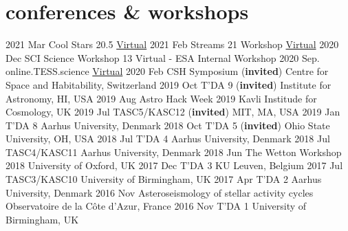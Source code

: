 \documentclass[letterpaper]{k-cv} %
\begin{document}
\clearpage
{}

\section{\color{c1}conferences \& workshops}

\begin{entrylist}
\centrythree
{2021 Mar}
{Cool Stars 20.5}
{\href{http://coolstars20.cfa.harvard.edu/cs20half/program.html}{Virtual}}
\centrythree
{2021 Feb}
{Streams 21 Workshop}
{\href{https://stellarstreams.org/streams21/}{Virtual}}
\centrythree
{2020 Dec}
{SCI Science Workshop 13}
{Virtual - ESA Internal Workshop}
\centrythree
{2020 Sep.}
{online.TESS.science}
{\href{https://online.tess.science/}{Virtual}}
\centrythree
{2020 Feb}
{CSH Symposium (\textbf{\textcolor{c1}{invited}})}
{Centre for Space and Habitability, Switzerland}
\centrythree
{2019 Oct}
{T'DA 9 (\textbf{\textcolor{c1}{invited}})}
{Institute for Astronomy, HI, USA}
\centrythree
{2019 Aug}
{Astro Hack Week 2019}
{Kavli Institude for Cosmology, UK}
\centrythree
{2019 Jul}
{TASC5/KASC12  (\textbf{\textcolor{c1}{invited}})}
{MIT, MA, USA}
\centrythree
{2019 Jan}
{T'DA 8}
{Aarhus University, Denmark}
\centrythree
{2018 Oct}
{T'DA 5 (\textbf{\textcolor{c1}{invited}})}
{Ohio State University, OH, USA}
\centrythree
{2018 Jul}
{T'DA 4}
{Aarhus University, Denmark}
\centrythree
{2018 Jul}
{TASC4/KASC11}
{Aarhus University, Denmark}
\centrythree
{2018 Jun}
{The Wetton Workshop 2018}
{University of Oxford, UK}
\centrythree
{2017 Dec}
{T'DA 3}
{KU Leuven, Belgium}
\centrythree
{2017 Jul}
{TASC3/KASC10}
{University of Birmingham, UK}
\centrythree
{2017 Apr}
{T'DA 2}
{Aarhus University, Denmark}
\centrythree
{2016 Nov}
{Asteroseismology of stellar activity cycles}
{Observatoire de la C\^{o}te d'Azur, France}
\centrythree
{2016 Nov}
{T'DA 1}
{University of Birmingham, UK}
\end{entrylist}
\end{document}
